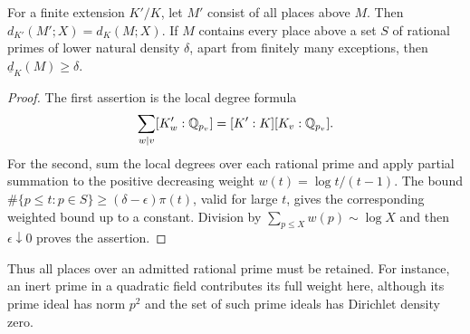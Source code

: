\begin{lemma}
\label{lem:B-density-transport}
For a finite extension $K'/K$, let $M'$ consist of all places above
$M$.  Then $d_{K'}(M';X)=d_K(M;X)$.  If $M$ contains every place
above a set $S$ of rational primes of lower natural density $\delta$,
apart from finitely many exceptions, then
$\underline d_K(M)\ge\delta$.
\end{lemma}
\begin{proof}
The first assertion is the local degree formula
\[
 \sum_{w\mid v}[K'_w:\mathbb Q_{p_v}]
            =[K':K][K_v:\mathbb Q_{p_v}].
\]
For the second, sum the local degrees over each rational prime and
apply partial summation to the positive decreasing weight
$w(t)=\log t/(t-1)$.  The bound
$\#\{p\le t:p\in S\}\ge(\delta-\epsilon)\pi(t)$, valid for
large $t$, gives the corresponding weighted bound up to a constant.
Division by $\sum_{p\le X}w(p)\sim\log X$ and then
$\epsilon\downarrow0$ proves the assertion.
\end{proof}
Thus all places over an admitted rational prime must be retained.
For instance, an inert prime in a quadratic field contributes its
full weight here, although its prime ideal has norm $p^2$ and the
set of such prime ideals has Dirichlet density zero.


